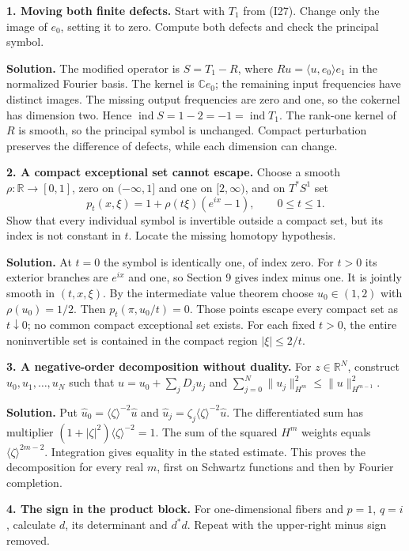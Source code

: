 \documentclass[
  11pt,
]{article}
\begin{document}
\textbf{1. Moving both finite defects.} Start with \(T_1\) from (I27).
Change only the image of \(e_0\), setting it to zero. Compute both
defects and check the principal symbol.

\textbf{Solution.} The modified operator is \(S=T_1-R\), where
\(Ru=\langle u,e_0\rangle e_1\) in the normalized Fourier basis. The
kernel is \(\mathbb C e_0\); the remaining input frequencies have
distinct images. The missing output frequencies are zero and one, so the
cokernel has dimension two. Hence
\(\operatorname{ind}S=1-2=-1=\operatorname{ind}T_1\). The rank-one
kernel of \(R\) is smooth, so the principal symbol is unchanged. Compact
perturbation preserves the difference of defects, while each dimension
can change.

\textbf{2. A compact exceptional set cannot escape.} Choose a smooth
\(\rho:\mathbb R\to[0,1]\), zero on \(( -\infty,1]\) and one on
\([2,\infty)\), and on \(T^*S^1\) set \[
p_t(x,\xi)=1+\rho(t\xi)(e^{ix}-1),\qquad 0\leq t\leq1.
\tag{I67}
\] Show that every individual symbol is invertible outside a compact
set, but its index is not constant in \(t\). Locate the missing homotopy
hypothesis.

\textbf{Solution.} At \(t=0\) the symbol is identically one, of index
zero. For \(t>0\) its exterior branches are \(e^{ix}\) and one, so
Section 9 gives index minus one. It is jointly smooth in \((t,x,\xi)\).
By the intermediate value theorem choose \(u_0\in(1,2)\) with
\(\rho(u_0)=1/2\). Then \(p_t(\pi,u_0/t)=0\). Those points escape every
compact set as \(t\downarrow0\); no common compact exceptional set
exists. For each fixed \(t>0\), the entire noninvertible set is
contained in the compact region \(|\xi|\leq2/t\).

\textbf{3. A negative-order decomposition without duality.} For
\(z\in\mathbb R^N\), construct \(u_0,u_1,\ldots,u_N\) such that
\(u=u_0+\sum_jD_ju_j\) and
\(\sum_{j=0}^N\|u_j\|_{H^m}^2\leq\|u\|_{H^{m-1}}^2\).

\textbf{Solution.} Put
\(\widehat u_0=\langle\zeta\rangle^{-2}\widehat u\) and
\(\widehat u_j=\zeta_j\langle\zeta\rangle^{-2}\widehat u\). The
differentiated sum has multiplier
\((1+|\zeta|^2)\langle\zeta\rangle^{-2}=1\). The sum of the squared
\(H^m\) weights equals \(\langle\zeta\rangle^{2m-2}\). Integration gives
equality in the stated estimate. This proves the decomposition for every
real \(m\), first on Schwartz functions and then by Fourier completion.

\textbf{4. The sign in the product block.} For one-dimensional fibers
and \(p=1\), \(q=i\), calculate \(d\), its determinant and \(d^*d\).
Repeat with the upper-right minus sign removed.
\end{document}

